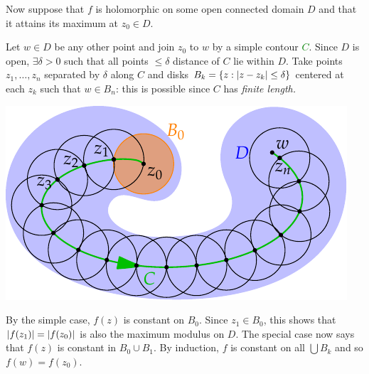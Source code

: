\pagebreak
\goodbreak
\begin{tcolorbox}[proofstyle]
\begin{minipage}[t]{0.55\linewidth}\vspace{0pt}
Now suppose that $f$ is holomorphic on some open connected domain $D$ and that it attains its maximum at $z_0\in D$.\par
Let $w\in D$ be any other point and join $z_0$ to $w$ by a simple contour \textcolor{Green}{$C$}.\smallbreak
Since $D$ is open, $\exists\delta>0$ such that all points $\le\delta$ distance of $C$ lie within $D$.\smallbreak
Take points $z_1,\ldots,z_n$ separated by $\delta$ along $C$ and disks $B_k=\{z:\left| z-z_k\right|\le\delta\}$ centered at each $z_k$ such that $w\in B_n$: this is possible since $C$ has \emph{finite length.}
\end{minipage}\begin{minipage}[t]{0.45\linewidth}\vspace{0pt}
\flushright\includegraphics[scale=0.9]{maxmod}
\end{minipage}\medbreak
By the simple case, $f(z)$ is constant on $B_0$. Since $z_1\in B_0$, this shows that $\left| f(z_1)\right|=\left| f(z_0)\right|$ is also the maximum modulus on $D$. The special case now says that $f(z)$ is constant in $B_0\cup B_1$. By induction, $f$ is constant on all $\bigcup B_k$ and so $f(w)=f(z_0)$.\hfill\qedsymbol
\end{tcolorbox}


